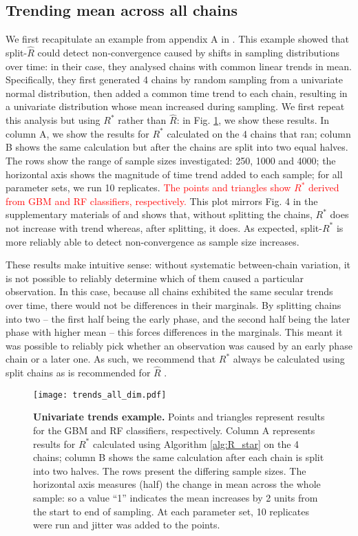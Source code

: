 \documentclass{article}
\begin{document}
\subsection{Trending mean across all chains}\label{sec:non-stationary_chains}
We first recapitulate an example from appendix A in \cite{vehtari2019rank}. This example showed that split-$\widehat{R}$ could detect non-convergence caused by shifts in sampling distributions over time: in their case, they analysed chains with common linear trends in mean. Specifically, they first generated 4 chains by random sampling from a univariate normal distribution, then added a common time trend to each chain, resulting in a univariate distribution whose mean increased during sampling. We first repeat this analysis but using $R^*$ rather than $\widehat{R}$: in Fig. \ref{fig:trends_all_dim}, we show these results. In column A, we show the results for $R^*$ calculated on the 4 chains that ran; column B shows the same calculation but after the chains are split into two equal halves. The rows show the range of sample sizes investigated: 250, 1000 and 4000; the horizontal axis shows the magnitude of time trend added to each sample; for all parameter sets, we run 10 replicates. \textcolor{red}{The points and triangles show $R^*$ derived from GBM and RF classifiers, respectively.} This plot mirrors Fig. 4 in the supplementary materials of \cite{vehtari2019rank} and shows that, without splitting the chains, $R^*$ does not increase with trend whereas, after splitting, it does. As expected, split-$R^*$ is more reliably able to detect non-convergence as sample size increases.

These results make intuitive sense: without systematic between-chain variation, it is not possible to reliably determine which of them caused a particular observation. In this case, because all chains exhibited the same secular trends over time, there would not be differences in their marginals. By splitting chains into two -- the first half being the early phase, and the second half being the later phase with higher mean -- this forces differences in the marginals. This meant it was possible to reliably pick whether an observation was caused by an early phase chain or a later one. As such, we recommend that $R^*$ always be calculated using split chains as is recommended for $\widehat{R}$ \citep{carpenter2017stan,vehtari2019rank}.

\begin{figure}[!htb]
	\centerline{\texttt{[image: trends\_all\_dim.pdf]}}
	\caption{\textbf{Univariate trends example.} Points and triangles represent results for the GBM and RF classifiers, respectively. Column A represents results for $R^*$ calculated using Algorithm \ref{alg:R_star} on the 4 chains; column B  shows the same calculation after each chain is split into two halves. The rows present the differing sample sizes. The horizontal axis measures (half) the change in mean across the whole sample: so a value ``1'' indicates the mean increases by 2 units from the start to end of sampling. At each parameter set, 10 replicates were run and jitter was added to the points.}
	\label{fig:trends_all_dim}
\end{figure}
\end{document}
